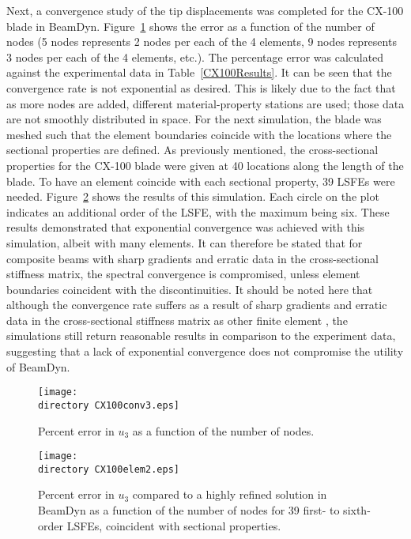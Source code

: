 \documentclass{aiaa-tc}
\def\directory{EPSF/}
\begin{document}
Next, a convergence study of the tip displacements was completed for the CX-100 blade in BeamDyn. Figure~\ref{CX100conv3} shows the error as a function of the number of nodes (5 nodes represents 2 nodes per each of the 4 elements, 9 nodes represents 3 nodes per each of the 4 elements, etc.). The percentage error was calculated against the experimental data in Table~\ref{CX100Results}. It can be seen that the convergence rate is not exponential as desired. This is likely due to the fact that as more nodes are added, different material-property stations are used; those data are not smoothly distributed in space. For the next simulation, the blade was meshed such that the element boundaries coincide with the locations where the sectional properties are defined. As previously mentioned, the cross-sectional properties for the CX-100 blade were given at 40 locations along the length of the blade. To have an element coincide with each sectional property, 39 LSFEs were needed. Figure~\ref{CX100elem2} shows the results of this simulation. Each circle on the plot indicates an additional order of the LSFE, with the maximum being six. These results demonstrated that  exponential convergence was achieved with this simulation, albeit with many elements. It can therefore be stated that for composite beams with sharp gradients and erratic data in the cross-sectional stiffness matrix, the spectral convergence is compromised, unless element boundaries coincident with the discontinuities. It should be noted here that although the convergence rate suffers as a result of sharp gradients and erratic data in the cross-sectional stiffness matrix as other finite element \cite{Luscher:2013}, the simulations still return reasonable results in comparison to the experiment data, suggesting that a lack of exponential convergence does not compromise the utility of BeamDyn.
  

\begin{figure}
\centering
\texttt{[image: \\directory CX100conv3.eps]}
\caption{ Percent error in $u_3$ as a function of the number of nodes.} 
\label{CX100conv3}
\end{figure}

\begin{figure}
\centering
\texttt{[image: \\directory CX100elem2.eps]}
\caption{Percent error in $u_3$ compared to a highly refined solution in BeamDyn as a function of the number of nodes for 39 first- to sixth-order LSFEs, coincident with sectional properties.} 
\label{CX100elem2}
\end{figure}
\end{document}
